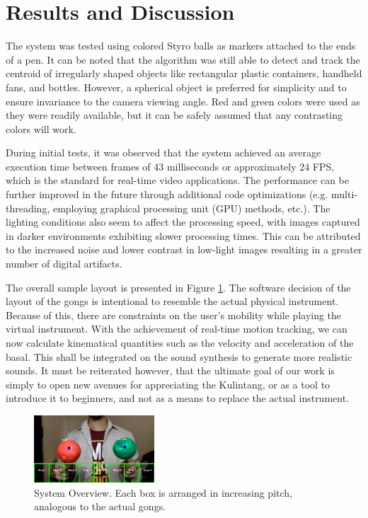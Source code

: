 \documentclass[10pt,a4paper,twoside]{article}
\begin{document}
\section{Results and Discussion}
The system was tested using colored Styro balls as markers attached to the ends of a pen. It can be noted that the algorithm was still able to detect and track the centroid of irregularly shaped objects like rectangular plastic containers, handheld fans, and  bottles. However, a spherical object is preferred for simplicity and to ensure invariance to the camera viewing angle. Red and green colors were used as they were readily available, but it can be safely assumed that any contrasting colors will work. 

During initial tests, it was observed that the system achieved an average execution time between frames of 43 milliseconds or approximately 24 FPS, which is the standard for real-time video applications. The performance can be further improved in the future through additional code optimizations (e.g. multi-threading, employing graphical processing unit (GPU) methods, etc.). The lighting conditions also seem to affect the processing speed, with images captured in darker environments exhibiting slower processing times. This can be attributed to the increased noise and lower contrast in low-light images resulting in a greater number of digital artifacts. 

The overall sample layout is presented in Figure \ref{fig:system}. The software decision of the layout of the gongs is intentional to resemble the actual physical instrument. Because of this, there are constraints on the user's mobility while playing the virtual instrument. With the achievement of real-time motion tracking, we can now calculate kinematical quantities such as the velocity and acceleration of the basal. This shall be integrated on the sound synthesis to generate more realistic sounds. It must be reiterated  however, that the ultimate goal of our work is simply to open new avenues for appreciating the Kulintang, or as a tool to introduce it to beginners, and not as a means to replace the actual instrument.

\begin{figure}[h!]
  \centering
  \includegraphics[width=0.40\textwidth]{system.png}
  \caption{System Overview. Each box is arranged in increasing pitch, analogous to the actual gongs.}
  \label{fig:system}
\end{figure}
\end{document}
